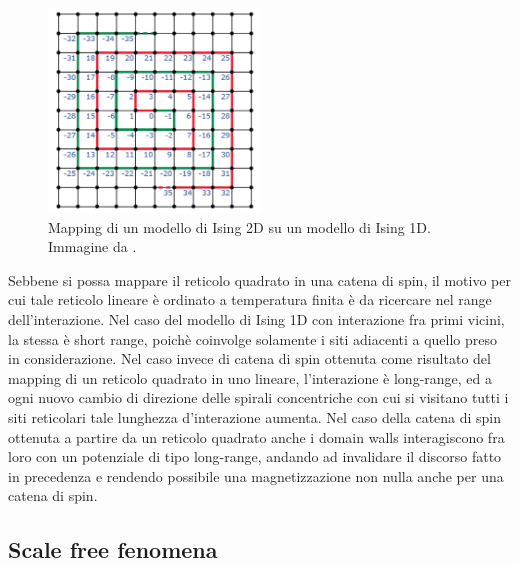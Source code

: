 \begin{figure}[H]
    \centering
    \includegraphics[width=0.5\textwidth]{Immagini/map_2to1_Ising.png}
    \caption{Mapping di un modello di Ising 2D su un modello di Ising 1D. Immagine da \cite{galliFSA}.}
    \label{fig: map_2to1_Ising}
\end{figure}

Sebbene si possa mappare il reticolo quadrato in una catena di spin, il motivo per cui tale reticolo lineare è ordinato a temperatura 
finita è da ricercare nel range dell'interazione. Nel caso del modello di Ising 1D con interazione fra primi vicini, la stessa è short 
range, poichè coinvolge solamente i siti adiacenti a quello preso in considerazione. Nel caso invece di catena di spin ottenuta come 
risultato del mapping di un reticolo quadrato in uno lineare, l'interazione è long-range, ed a ogni nuovo cambio di direzione delle 
spirali concentriche con cui si visitano tutti i siti reticolari tale lunghezza d'interazione aumenta. Nel caso della catena di 
spin ottenuta a partire da un reticolo quadrato anche i domain walls interagiscono fra loro con un potenziale di tipo long-range, andando 
ad invalidare il discorso fatto in precedenza e rendendo possibile una magnetizzazione non nulla anche per una catena di spin. 

\subsection{Scale free fenomena}



